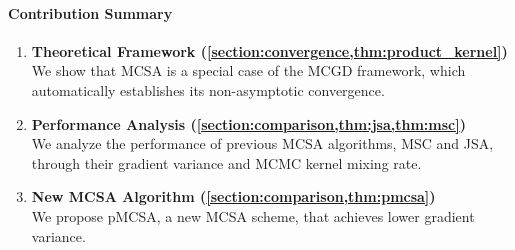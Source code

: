 \paragraph{Contribution Summary}
\begin{enumerate}[leftmargin=5mm,listparindent=\parindent]
\vspace{-0.05in}
\item \textbf{Theoretical Framework (\cref{section:convergence,thm:product_kernel})} \\
  We show that MCSA is a special case of the MCGD framework, which automatically establishes its non-asymptotic convergence.
\item \textbf{Performance Analysis (\cref{section:comparison,thm:jsa,thm:msc})} \\
  We analyze the performance of previous MCSA algorithms, MSC and JSA, through their gradient variance and MCMC kernel mixing rate.
\item \textbf{New MCSA Algorithm (\cref{section:comparison,thm:pmcsa})} \\
  We propose pMCSA, a new MCSA scheme, that achieves lower gradient variance.
\end{enumerate}

